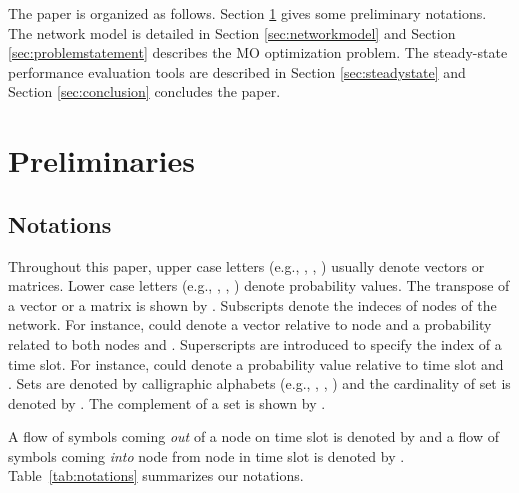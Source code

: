 \documentclass[a4paper]{article}
\begin{document}
The paper is organized as follows. Section \ref{sec:preliminaries} gives some preliminary notations. The network model is detailed in Section \ref{sec:networkmodel} and Section \ref{sec:problemstatement} describes the MO optimization problem. The steady-state performance evaluation tools are described in Section \ref{sec:steadystate} and Section \ref{sec:conclusion} concludes the paper. 

\section{Preliminaries}\label{sec:preliminaries}

\subsection{Notations}
Throughout this paper, upper case letters (e.g., , , ) usually denote vectors or matrices. 
Lower case letters (e.g., , , ) denote probability values. 
The transpose of a vector or a matrix is shown by . 
Subscripts denote the indeces of nodes of the network. For instance,  could denote a vector relative to node  and  a probability related to both nodes  and .
Superscripts are introduced to specify the index of a time slot. For instance,  could denote a probability value relative to time slot  and . 
Sets are denoted by calligraphic alphabets (e.g., , , ) and the cardinality of set  is denoted by . The complement of a set  is shown by .

A flow of symbols coming \emph{out} of a node  on time slot  is denoted by  and a flow of symbols coming \emph{into} node  from node  in time slot  is denoted by  .  
Table~\ref{tab:notations} summarizes our notations.
\end{document}
